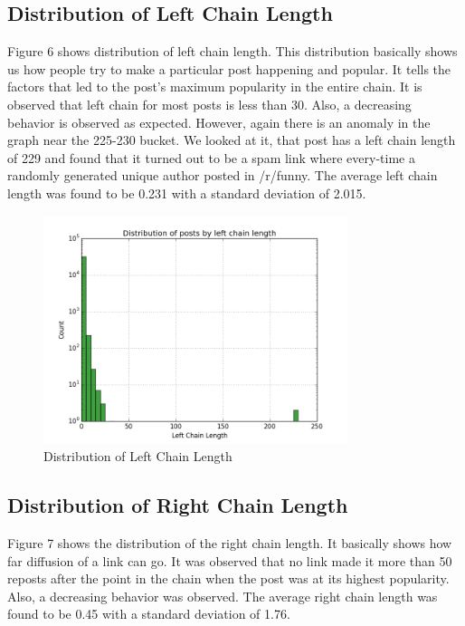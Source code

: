 \documentclass{article} %
\begin{document}
\newpage

\subsection{Distribution of Left Chain Length}

Figure 6 shows distribution of left chain length. This distribution basically shows us how people try to make a particular post happening and popular. It tells the factors that led to the post's maximum popularity in the entire chain. It is observed that left chain for most posts is less than 30. Also, a decreasing behavior is observed as expected. However, again there is an anomaly in the graph near the 225-230 bucket. We looked at it, that post has a left chain length of 229 and found that it turned out to be a spam link where every-time a randomly generated unique author posted in /r/funny.
The average left chain length was found to be 0.231 with a standard deviation of 2.015.

\begin{figure}[h]
\begin{center}
\includegraphics[width=3.5in]{left_chain.png}
\caption{Distribution of Left Chain Length}
\end{center}
\end{figure}

\subsection{Distribution of Right Chain Length}

Figure 7 shows the distribution of the right chain length. It basically shows how far diffusion of a link can go. It was observed that no link made it more than 50 reposts after the point in the chain when the post was at its highest popularity. Also, a decreasing behavior was observed. 
The average right chain length was found to be 0.45 with a standard deviation of 1.76.
\end{document}
